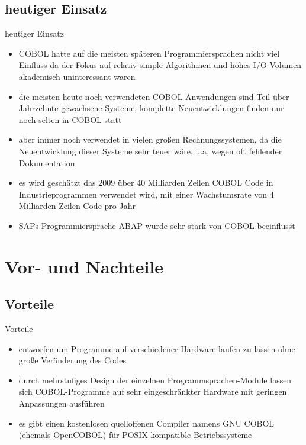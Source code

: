 \documentclass{beamer}
\begin{document}
\subsection{heutiger Einsatz}

\begin{frame}{heutiger Einsatz}
	\begin{itemize}
		\item
			COBOL hatte auf die meisten sp\"ateren Programmiersprachen nicht viel Einfluss da der Fokus auf relativ simple Algorithmen und hohes I/O-Volumen akademisch uninteressant waren
		\item
			die meisten heute noch verwendeten COBOL Anwendungen sind Teil \"uber Jahrzehnte gewachsene Systeme, komplette Neuentwicklungen finden nur noch selten in COBOL statt
		\item
			aber immer noch verwendet in vielen großen Rechnungssystemen, da die Neuentwicklung dieser Systeme sehr teuer wäre, u.a. wegen oft fehlender Dokumentation
		\item
			es wird gesch\"atzt das 2009 \"uber 40 Milliarden Zeilen COBOL Code in Industrieprogrammen verwendet wird, mit einer Wachstumsrate von 4 Milliarden Zeilen Code pro Jahr
		\item
			SAPs Programmiersprache ABAP wurde sehr stark von COBOL beeinflusst
	\end{itemize}
\end{frame}

\section{Vor- und Nachteile}

\subsection{Vorteile}

\begin{frame}{Vorteile}
	\begin{itemize}
		\item
			entworfen um Programme auf verschiedener Hardware laufen zu lassen ohne große Ver\"anderung des Codes
		\item
			durch mehrstufiges Design der einzelnen Programmsprachen-Module lassen sich COBOL-Programme auf sehr eingeschr\"ankter Hardware mit geringen Anpassungen ausf\"uhren
		\item
			es gibt einen kostenlosen quelloffenen Compiler namens GNU COBOL (ehemals OpenCOBOL) für POSIX-kompatible Betriebssysteme
	\end{itemize}
\end{frame}
\end{document}
